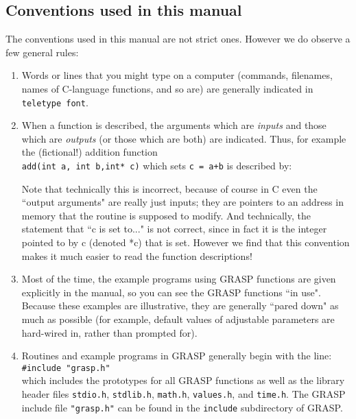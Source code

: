 \subsection{Conventions used in this manual}
The conventions used in this manual are not strict ones.  However we do
observe a few general rules:
\begin{enumerate}
\item
Words or lines that you might type on a computer (commands, filenames,
names of C-language functions, and so are) are generally indicated
in {\tt teletype font}.
\item
When a function is described, the arguments which are {\it inputs} and those
which are {\it outputs} (or those which are both) are indicated.  Thus,
for example the (fictional!) addition function\\ \mbox{\tt add(int a, int b,int* c)} which sets
{\tt *c = a+b} is described by:
Note that technically this is incorrect, because of course in C even
the ``output arguments" are really just inputs; they are pointers to an
address in memory that the routine is supposed to modify.  And
technically, the statement that ``c is set to..." is not correct, since
in fact it is the integer pointed to by c (denoted *c) that is set.
However we find that this convention makes it much easier to read the
function descriptions!
\item
Most of the time, the example programs using GRASP functions are given
explicitly in the manual, so you can see the GRASP functions ``in use".
Because these examples are illustrative, they are generally ``pared down"
as much as possible (for example, default values of adjustable parameters
are hard-wired in, rather than prompted for).
\item
Routines and example programs in GRASP generally begin with
the line:\\
{\tt \#include "grasp.h"}\\
which includes the prototypes for all GRASP functions as well as
the library header files {\tt stdio.h}, {\tt stdlib.h},
{\tt math.h}, {\tt values.h}, and {\tt time.h}.  The GRASP include
file {\tt "grasp.h"} can be found in the {\tt include} subdirectory
of GRASP.
\end{enumerate}

